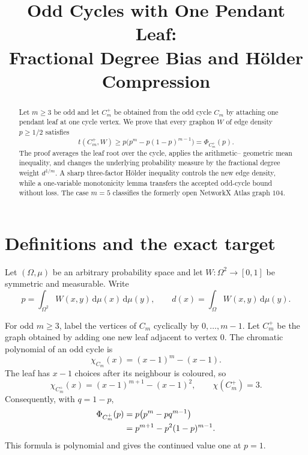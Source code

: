 \documentclass[11pt]{article}
\title{Odd Cycles with One Pendant Leaf:\\
Fractional Degree Bias and H\"older Compression}
\author{}
\date{}
\newcommand{\dd}{\,\mathrm d}
\begin{document}
\maketitle

\begin{abstract}
Let $m\geq3$ be odd and let $C_m^+$ be obtained from the odd cycle $C_m$
by attaching one pendant leaf at one cycle vertex.  We prove that every
graphon $W$ of edge density $p\geq1/2$ satisfies
\[
 t(C_m^+,W)
 \geq p\bigl(p^m-p(1-p)^{m-1}\bigr)
 =\Phi_{C_m^+}(p).
\]
The proof averages the leaf root over the cycle, applies the arithmetic--
geometric mean inequality, and changes the underlying probability measure
by the fractional degree weight $d^{1/m}$.  A sharp three-factor H\"older
inequality controls the new edge density, while a one-variable monotonicity
lemma transfers the accepted odd-cycle bound without loss.  The case $m=5$
classifies the formerly open NetworkX Atlas graph $104$.
\end{abstract}


\section{Definitions and the exact target}

Let $(\Omega,\mu)$ be an arbitrary probability space and let
$W\colon\Omega^2\to[0,1]$ be symmetric and measurable.  Write
\[
 p=\int_{\Omega^2}W(x,y)\dd\mu(x)\dd\mu(y),
 \qquad
 d(x)=\int_\Omega W(x,y)\dd\mu(y).
\]

For odd $m\geq3$, label the vertices of $C_m$ cyclically by
$0,\ldots,m-1$.  Let $C_m^+$ be the graph obtained by adding one new leaf
adjacent to vertex $0$.  The chromatic polynomial of an odd cycle is
\[
 \chi_{C_m}(x)=(x-1)^m-(x-1).
\]
The leaf has $x-1$ choices after its neighbour is coloured, so
\begin{equation}
 \chi_{C_m^+}(x)
 =(x-1)^{m+1}-(x-1)^2,
 \qquad \chi(C_m^+)=3.
 \label{eq:chromatic}
\end{equation}
Consequently, with $q=1-p$,
\begin{align}
 \Phi_{C_m^+}(p)
 &=p\bigl(p^m-pq^{m-1}\bigr)
 \notag\\
 &=p^{m+1}-p^2(1-p)^{m-1}.
 \label{eq:target}
\end{align}
This formula is polynomial and gives the continued value one at $p=1$.
\end{document}
